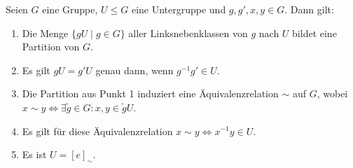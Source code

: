 \begin{lemma}\label{lemma:euqivrel_linksnebenklassen}
    Seien $G$ eine Gruppe, $U \le G$ eine Untergruppe und $g, g', x, y \in G$. Dann gilt:
    \begin{enumerate}
        \item Die Menge $\{gU \mid g \in G\}$ aller Linksnebenklassen von $g$ nach $U$ bildet eine Partition von $G$.
        \item Es gilt $gU = g'U$ genau dann, wenn $g^{-1}g' \in U$.
        \item Die Partition aus Punkt 1 induziert eine Äquivalenzrelation $\sim$ auf $G$, wobei $x \sim y \Leftrightarrow \exists \tilde{g} \in G: x,y \in \tilde{g}U$.
        \item Es gilt für diese Äquivalenzrelation $x \sim y \Leftrightarrow x^{-1}y \in U$.\label{item:lemma:euqivrel_linksnebenklassen_4}
        \item Es ist $U = [e]_{\sim}$.
    \end{enumerate}
    
\end{lemma}
